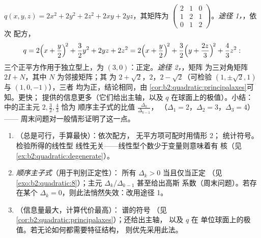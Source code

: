 \begin{example}\label{ex:b2:quadratic:tworoads}
$q(x, y, z) = 2x^2 + 2y^2 + 2z^2 + 2xy + 2yz$，其矩阵为
$\begin{pmatrix} 2 & 1 & 0\\ 1 & 2 & 1\\ 0 & 1 & 2
\end{pmatrix}$。\emph{途径 1，}，依次
配方，
\[
q = 2\Bigl(x + \frac y2\Bigr)^{\!2} + \frac32 y^2 + 2yz + 2z^2
= 2\Bigl(x + \frac y2\Bigr)^{\!2}
+ \frac32\Bigl(y + \frac{2z}{3}\Bigr)^{\!2} + \frac43 z^2 :
\]
三个正平方作用于独立型上，为 $(3,
0)$：正定。\emph{途径 2，}，矩阵
为三对角矩阵 $2I + N$，其中 $N$ 为邻接矩阵；其
为 $2 + \sqrt2$，$2$，$2 - \sqrt2$（可检验
 $(1, \pm\sqrt2, 1)$ 与 $(1, 0, -1)$），三者
均为正，结论相同，由
\cref{cor:b2:quadratic:principalaxes}可知。更快；
提供的信息更多（它们给出主轴，以及
$q$ 在球面上的极值）。小结：
中的正主元 $2, \frac32, \frac43$ 恰为
顺序主子式的比值 $\frac{\Delta_k}{\Delta_{k-1}}$，
（$\Delta_1 = 2$，$\Delta_2 = 3$，$\Delta_3 = 4$）——
周末问题对一般情形证明了这一点。
\end{example}

\begin{method}\label{met:b2:quadratic:signature}
\begin{enumerate}
  \item \emph{}（总是可行，手算最快）：依次配方，
        无平方项可配时用情形 2；
        统计符号。检验所得的线性型
        线性无关——线性型个数少于变量则意味着有
        核（见\cref{ex:b2:quadratic:degenerate}）。
  \item \emph{顺序主子式}（用于判别正定性）：
        所有 $\Delta_k > 0$ 当且仅当正定
        （见\cref{exo:b2:quadratic:8}）；主元
        $\Delta_k/\Delta_{k-1}$ 甚至给出高斯
        系数（周末问题）。若存在某个
        $\Delta_k = 0$，则此法悄然失效：改用途径 1。
  \item \emph{}（信息量最大，计算代价最高）：
        谱的符号
        （见\cref{cor:b2:quadratic:principalaxes}）；还给出主轴，
        以及 $q$ 在
        单位球面上的极值。若无论如何都需要特征结构，
        则优先采用此法。
\end{enumerate}
\end{method}

